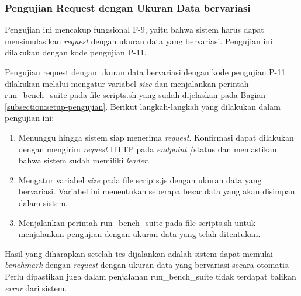 \subsubsection{Pengujian Request dengan Ukuran Data bervariasi}
\label{subsubsection:pengujian-request-ukuran-data}

Pengujian ini mencakup fungsional F-9, yaitu bahwa sistem harus dapat mensimulasikan \textit{request} dengan ukuran data yang bervariasi. Pengujian ini dilakukan dengan kode pengujian P-11.

Pengujian request dengan ukuran data bervariasi dengan kode pengujian P-11 dilakukan melalui mengatur variabel \textit{size} dan menjalankan perintah run\_bench\_suite pada file scripts.sh yang sudah dijelaskan pada Bagian \ref{subsection:setup-pengujian}. Berikut langkah-langkah yang dilakukan dalam pengujian ini:

\begin{enumerate}
    \item Menunggu hingga sistem siap menerima \textit{request}. Konfirmasi dapat dilakukan dengan mengirim \textit{request} HTTP pada \textit{endpoint} /status dan memastikan bahwa sistem sudah memiliki \textit{leader}.
    \item Mengatur variabel \textit{size} pada file scripts.js dengan ukuran data yang bervariasi. Variabel ini menentukan seberapa besar data yang akan disimpan dalam sistem.
    \item Menjalankan perintah run\_bench\_suite pada file scripts.sh untuk menjalankan pengujian dengan ukuran data yang telah ditentukan.
\end{enumerate}

Hasil yang diharapkan setelah tes dijalankan adalah sistem dapat memulai \textit{benchmark} dengan \textit{request} dengan ukuran data yang bervariasi secara otomatis. Perlu dipastikan juga dalam penjalanan run\_bench\_suite tidak terdapat balikan \textit{error} dari sistem.